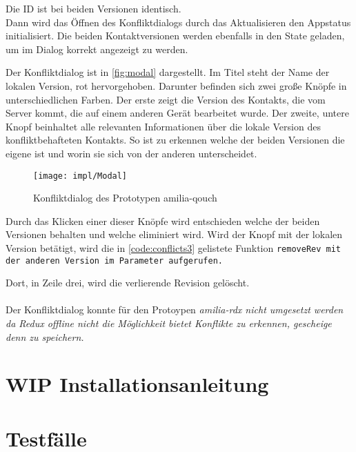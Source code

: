 Die ID ist bei beiden Versionen identisch.\\
Dann wird das Öffnen des Konfliktdialogs durch das Aktualisieren den \gls{App}status initialisiert.
Die beiden Kontaktversionen werden ebenfalls in den State geladen, um im Dialog korrekt angezeigt zu werden.
%
\begin{center}
  
\end{center}
%
Der Konfliktdialog ist in \autoref{fig:modal} dargestellt.
Im Titel steht der Name der lokalen Version, rot hervorgehoben.
Darunter befinden sich zwei große Knöpfe in unterschiedlichen Farben.
Der erste zeigt die Version des Kontakts, die vom Server kommt, die auf einem anderen Gerät bearbeitet wurde.
Der zweite, untere Knopf beinhaltet alle relevanten Informationen über die lokale Version des konfliktbehafteten Kontakts.
So ist zu erkennen welche der beiden Versionen die eigene ist und worin sie sich von der anderen unterscheidet.
%
\begin{figure}[H]
  \centering
  \texttt{[image: impl/Modal]}
  \grayRule
  \caption{Konfliktdialog des Prototypen amilia-qouch}
  \label{fig:modal}
\end{figure}
%
Durch das Klicken einer dieser Knöpfe wird entschieden welche der beiden Versionen behalten und welche eliminiert wird.
Wird der Knopf mit der lokalen Version betätigt, wird die in \autoref{code:conflicts3} gelistete Funktion \tt{removeRev} mit der anderen Version im Parameter aufgerufen.
%
\begin{center}
  
\end{center}
%
Dort, in Zeile drei, wird die verlierende Revision gelöscht.\\\\
%
%
Der Konfliktdialog konnte für den Protoypen \it{amilia-rdx} nicht umgesetzt werden da Redux offline nicht die Möglichkeit bietet Konflikte zu erkennen, gescheige denn zu speichern. 
%
%
%
%
%
\section{WIP Installationsanleitung}


%
%
\section{\label{chap:impl:test}Testfälle}
